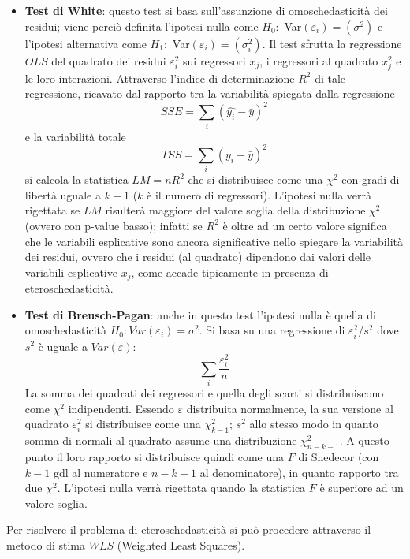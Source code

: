 \documentclass[a4page, 11pt]{article} %
\begin{document}
\begin{itemize}
\item \textbf{Test di White}: questo test si basa sull’assunzione di omoschedasticità dei residui; viene perciò definita l’ipotesi nulla come $H_0:$ Var$(\varepsilon_i) = (\sigma^2)$ e l’ipotesi alternativa come $H_1:$ Var$(\varepsilon_i ) = ( \sigma^2_i )$.
Il test sfrutta la regressione $OLS$ del quadrato dei residui $\varepsilon_i^2$ sui regressori $x_j$, i regressori al quadrato $x_j^2$ e le loro interazioni.
Attraverso l'indice di determinazione $R^{2}$ di tale regressione, ricavato dal rapporto tra la variabilità spiegata dalla regressione 
\[
SSE = \sum_{i}(\hat{y_i} - \bar{y})^2
\]
 e la variabilità totale 
\[ 
TSS = \sum_{i} (y_i - \bar{y})^2
\]
si calcola la statistica $LM=n R^{2}$ che si distribuisce come una $\chi^{2}$ con gradi di libertà uguale a $k - 1$ ($k$ è il numero di regressori). L’ipotesi nulla verrà rigettata se $LM$ risulterà maggiore del valore soglia della distribuzione $\chi^{2}$ (ovvero con p-value basso); %
infatti se $R^{2}$ è oltre ad un certo valore significa che le variabili esplicative sono ancora significative nello spiegare la variabilità dei residui, ovvero che i residui (al quadrato) dipendono dai valori delle variabili esplicative $x_j$, come accade tipicamente in presenza di eteroschedasticità.

\item \textbf{Test di Breusch-Pagan}: anche in questo test l’ipotesi nulla è quella di omoschedasticità $H_0: Var(\varepsilon_i) = \sigma^2$.
Si basa su una regressione di $\varepsilon^{2}_i$/$s^{2}$ dove $s^{2}$ è uguale a $Var(\varepsilon)$:
\[
\sum_{i}\frac{\varepsilon_i^2}{n}
\] 
La somma dei quadrati dei regressori e quella degli scarti si distribuiscono come $\chi^{2}$ indipendenti. Essendo $\varepsilon$ distribuita normalmente, la sua versione al quadrato $\varepsilon_i^2$ si distribuisce come una $\chi^2_{k-1}$; $s^2$ allo stesso modo in quanto somma di normali al quadrato assume una distribuzione $\chi^2_{n-k-1}$. A questo punto il loro rapporto si distribuisce quindi come una $F$ di Snedecor (con $k-1$ gdl al numeratore e $n-k-1$ al denominatore), in quanto rapporto tra due $\chi^2$. L’ipotesi nulla verrà rigettata quando la statistica $F$ è superiore ad un valore soglia.
\end{itemize}
Per risolvere il problema di eteroschedasticità si può procedere attraverso il metodo di stima $WLS$ (Weighted Least Squares).
\end{document}
